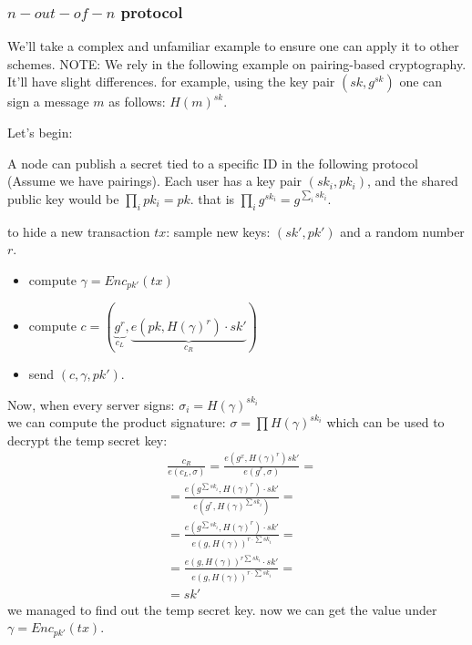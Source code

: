 \subsubsection*{$n-out-of-n$ protocol}
We'll take a complex and unfamiliar example to ensure one can apply it to other schemes.
NOTE: We rely in the following example on pairing-based cryptography. 
It'll have slight differences. 
for example, using the key pair $(sk, g^{sk})$ one can sign a message $m$ as follows: $H(m)^{sk}$.

Let's begin:


A node can publish a secret tied to a specific ID in the following protocol (Assume we have pairings).
Each user has a key pair $(sk_{i}, pk_{i})$, 
and the shared public key would be $\prod_{i}pk_{i}=pk$.
that is $\prod_{i}g^{sk_{i}}=g^{\sum_{i}sk_{i}}$.


to hide a new transaction $tx$: sample new keys: 
$\left(sk',pk'\right)$ and a random number $r$.
\begin{itemize}
\item compute $\gamma=Enc_{pk'}\left(tx\right)$
\item compute $c=\left(\underbrace{g^{r}}_{c_{L}},\underbrace{e\left(pk,H\left(\gamma\right)^{r}\right)\cdot sk'}_{c_{R}}\right)$ 
\item send $\left(c,\gamma,pk'\right)$.
\end{itemize}


Now, when every server signs: $\sigma_{i}=H\left(\gamma\right)^{sk_{i}}$\\
we can compute the product signature: $\sigma=\prod H\left(\gamma\right)^{sk_{i}}$
which can be used to decrypt the temp secret key: 
\begin{align*}
 & \frac{c_{R}}{e\left(c_{L},\sigma\right)}=\frac{e\left(g^{x},H\left(\gamma\right)^{r}\right)sk'}{e\left(g^{r},\sigma\right)}=\\
 & =\frac{e\left(g^{\sum sk_{i}},H\left(\gamma\right)^{r}\right)\cdot sk'}{e\left(g^{r},H\left(\gamma\right)^{\sum sk_{i}}\right)}=\\
 & =\frac{e\left(g^{\sum sk_{i}},H\left(\gamma\right)^{r}\right)\cdot sk'}{e\left(g,H\left(\gamma\right)\right)^{r\cdot\sum sk_{i}}}=\\
 & =\frac{e\left(g,H\left(\gamma\right)\right)^{r\sum sk_{i}}\cdot sk'}{e\left(g,H\left(\gamma\right)\right)^{r\cdot\sum sk_{i}}}=\\
 & =sk'
\end{align*}
 we managed to find out the temp secret key. now we can get the value
under $\gamma=Enc_{pk'}\left(tx\right)$.


